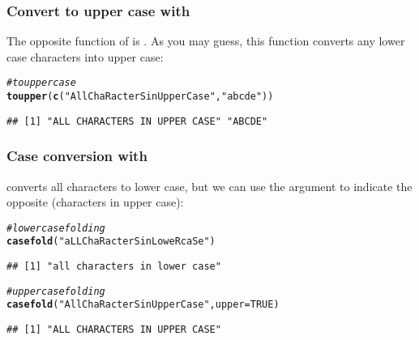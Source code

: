 \documentclass[12pt]{beamer}\usepackage[]{graphicx}\usepackage[]{color}
\makeatletter
\newcommand{\hlnum}[1]{\textcolor[rgb]{0.686,0.059,0.569}{#1}}%
\newcommand{\hlstr}[1]{\textcolor[rgb]{0.192,0.494,0.8}{#1}}%
\newcommand{\hlcom}[1]{\textcolor[rgb]{0.678,0.584,0.686}{\textit{#1}}}%
\newcommand{\hlstd}[1]{\textcolor[rgb]{0.345,0.345,0.345}{#1}}%
\newcommand{\hlkwc}[1]{\textcolor[rgb]{0.333,0.667,0.333}{#1}}%
\newcommand{\hlkwd}[1]{\textcolor[rgb]{0.737,0.353,0.396}{\textbf{#1}}}%
\newenvironment{kframe}{%
 \def\at@end@of@kframe{}%
 \ifinner\ifhmode%
  \def\at@end@of@kframe{\end{minipage}}%
  \begin{minipage}{\columnwidth}%
 \fi\fi%
 \def\FrameCommand##1{\hskip\@totalleftmargin \hskip-\fboxsep
 \colorbox{shadecolor}{##1}\hskip-\fboxsep
     \hskip-\linewidth \hskip-\@totalleftmargin \hskip\columnwidth}%
 \MakeFramed {\advance\hsize-\width
   \@totalleftmargin\z@ \linewidth\hsize
   \@setminipage}}%
 {\par\unskip\endMakeFramed%
 \at@end@of@kframe}
\newenvironment{knitrout}{}{} %
\makeatother
\begin{document}

\begin{frame}[fragile]
\frametitle{Convert to upper case with }

The opposite function of  is . As you may guess, this function converts any lower case characters into upper case:
\begin{knitrout}\footnotesize
{}\color{fgcolor}\begin{kframe}
\begin{alltt}
\hlcom{# to upper case}
\hlkwd{toupper}\hlstd{(}\hlkwd{c}\hlstd{(}\hlstr{"All ChaRacterS in Upper Case"}\hlstd{,} \hlstr{"abcde"}\hlstd{))}
\end{alltt}
\begin{verbatim}
## [1] "ALL CHARACTERS IN UPPER CASE" "ABCDE"
\end{verbatim}
\end{kframe}
\end{knitrout}

\end{frame}


\begin{frame}[fragile]
\frametitle{Case conversion with }

 converts all characters to lower case, but we can use the argument  to indicate the opposite (characters in upper case):
\begin{knitrout}\footnotesize
{}\color{fgcolor}\begin{kframe}
\begin{alltt}
\hlcom{# lower case folding}
\hlkwd{casefold}\hlstd{(}\hlstr{"aLL ChaRacterS in LoweR caSe"}\hlstd{)}
\end{alltt}
\begin{verbatim}
## [1] "all characters in lower case"
\end{verbatim}
\begin{alltt}
\hlcom{# upper case folding}
\hlkwd{casefold}\hlstd{(}\hlstr{"All ChaRacterS in Upper Case"}\hlstd{,} \hlkwc{upper} \hlstd{=} \hlnum{TRUE}\hlstd{)}
\end{alltt}
\begin{verbatim}
## [1] "ALL CHARACTERS IN UPPER CASE"
\end{verbatim}
\end{kframe}
\end{knitrout}

\end{frame}
\end{document}
